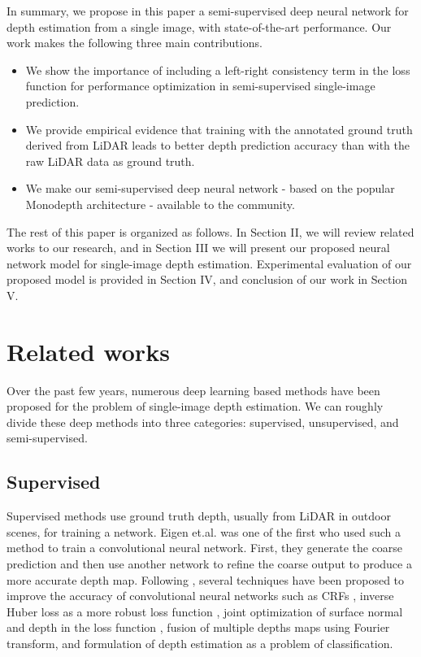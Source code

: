 \documentclass[letterpaper, 10 pt, conference]{ieeeconf}
\begin{document}
In summary, we propose in this paper a semi-supervised deep neural network for depth estimation from a single image, with state-of-the-art performance.  Our work makes the following three main contributions.
\begin{itemize}
\item  We show the importance of including a left-right consistency term in the loss function for performance optimization in semi-supervised single-image prediction.
\item We provide empirical evidence that training with the annotated ground truth derived from LiDAR leads to better depth prediction accuracy than with the raw LiDAR data as ground truth.
\item  We make our semi-supervised deep neural network - based on the popular Monodepth \cite{godard2017unsupervised} architecture - available to the community.
\end{itemize}

The rest of this paper is organized as follows.  In Section II, we will review related works to our research, and in Section III we will present our proposed neural network model for single-image depth estimation.   Experimental evaluation of our proposed model is provided in Section IV, and conclusion of our work in Section V.
 
    
\section{Related works}
Over the past few years, numerous deep learning based methods have been proposed for the problem of single-image depth estimation. We can roughly divide these deep methods into three categories:  supervised, unsupervised, and semi-supervised.

\subsection{Supervised}\label{sec:supervised}

Supervised methods use ground truth depth, usually from LiDAR in outdoor scenes, for training a network. Eigen et.al.\cite{eigen2014depth} was one of the first who used such a method to train a convolutional neural network. First, they generate the coarse prediction and then use another network to refine the coarse output to produce a more accurate depth map. Following \cite{eigen2014depth}, several techniques have been proposed to improve the accuracy of convolutional neural networks such as CRFs \cite{li2015depth}, inverse Huber loss as a more robust loss function \cite{laina2016deeper}, joint optimization of surface normal and depth in the loss function \cite{wang2015designing,hu2018revisiting,qi2018geonet}, fusion of multiple depths maps using Fourier transform\cite{lee2018single}, and formulation of depth estimation as a problem of classification\cite {fu2018deep}.
\end{document}
